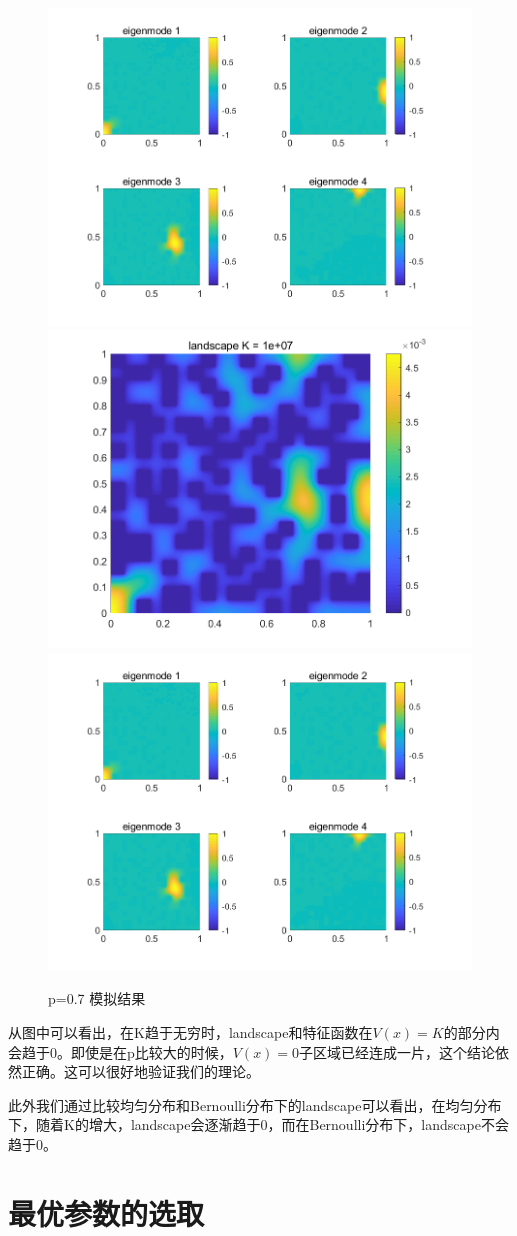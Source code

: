 \documentclass[12pt,a4paper]{article}
\begin{document}
\begin{figure}[htbp]
\includegraphics[width=0.4\linewidth]{potential/P7K3U}
\includegraphics[width=0.4\linewidth]{potential/P7K4W}
\includegraphics[width=0.4\linewidth]{potential/P7K4U}
\caption{p=0.7 模拟结果}
\label{P7}
\end{figure}

从图中可以看出，在K趋于无穷时，landscape和特征函数在$V(x) = K$的部分内会趋于0。即使是在p比较大的时候，$V(x)=0$子区域已经连成一片，这个结论依然正确。这可以很好地验证我们的理论。

此外我们通过比较均匀分布和Bernoulli分布下的landscape可以看出，在均匀分布下，随着K的增大，landscape会逐渐趋于0，而在Bernoulli分布下，landscape不会趋于0。

\newpage

\section{最优参数的选取}\label{parameter}
\end{document}
